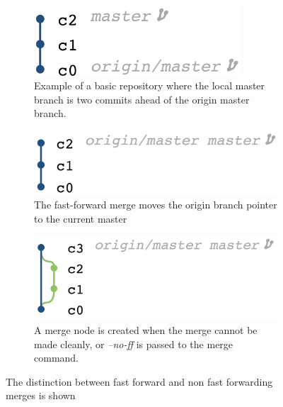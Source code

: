 
\begin{figure}[htpb]
  \centering
  \begin{subfigure}[b]{0.5\textwidth}
    \includegraphics[width=0.85\textwidth]{Figures/background/repos/base_repo.png}
    \caption{Example of a basic repository where the local master branch
      is two commits ahead of the origin master branch.}
  \end{subfigure}

  \begin{subfigure}[b]{0.5\textwidth}
    \includegraphics[width=\textwidth]{Figures/background/repos/fast_forward.png}
    \caption{The fast-forward merge moves the origin branch pointer to
      the current master}
    \label{fig:fast_forwarded_merge}
  \end{subfigure}

  \begin{subfigure}[b]{0.5\textwidth}
    \includegraphics[width=\textwidth]{Figures/background/repos/merge_commit.png}
    \caption{A merge node is created when the merge cannot be made
      cleanly, or \textit{--no-ff} is passed to the merge command.}
    \label{fig:merge_node_merge}
  \end{subfigure}
  \caption{The distinction between fast forward and non fast forwarding
  merges is shown}
  \label{fig:merge_styles}
\end{figure}

